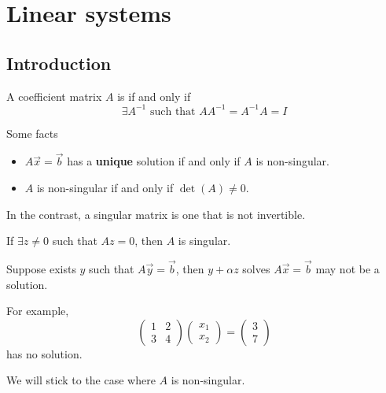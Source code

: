 \chapter{Linear systems}

\section{Introduction}

\begin{definition}
    A coefficient matrix \( A \) is  if and only if \[
        \exists A^{-1} \text{ such that } A A^{-1} = A^{-1} A = I
    \]
\end{definition}

\begin{remark}
    Some facts
    \begin{itemize}
        \item \( A\vec{x} = \vec{b} \) has a \textbf{unique} solution if and only if \( A \) is non-singular.
        \item \( A \) is non-singular if and only if \( \det(A) \neq 0 \).
    \end{itemize}
\end{remark}

In the contrast, a singular matrix is one that is not invertible.

\begin{proposition}
    If \( \exists z \neq 0 \) such that \( A z = 0 \), then \( A \) is singular.
\end{proposition}

\begin{remark}
    Suppose exists \( y \) such that \( A \vec{y} = \vec{b} \), then \( y + \alpha z \) solves \( A \vec{x} = \vec{b} \) may not be a solution.

    For example, \[
        \begin{pmatrix} 1 & 2 \\ 3 & 4 \end{pmatrix} \begin{pmatrix} x_1 \\ x_2 \end{pmatrix} = \begin{pmatrix} 3 \\ 7 \end{pmatrix}
    \] has no solution.
\end{remark}

We will stick to the case where \( A \) is non-singular.


